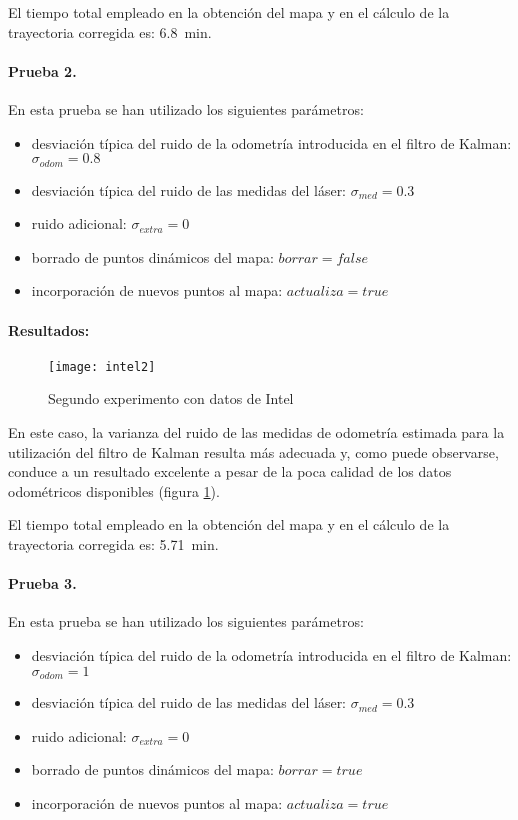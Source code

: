 El tiempo total empleado en la obtención del mapa y en el cálculo de la trayectoria corregida es: 6.8~min.

\paragraph{Prueba 2.}
En esta prueba se han utilizado los siguientes parámetros:
\begin{itemize}
  \item desviación típica del ruido de la odometría introducida en el filtro de Kalman: $\sigma_{odom} = 0.8$
  \item desviación típica del ruido de las medidas del láser: $\sigma_{med} = 0.3$
  \item ruido adicional: $\sigma_{extra} = 0$
  \item borrado de puntos dinámicos del mapa: $borrar = false$
  \item incorporación de nuevos puntos al mapa: $actualiza = true$
\end{itemize}

\paragraph{Resultados:}

\begin{figure}[h]
  \centering\texttt{[image: intel2]}\\
  \caption{Segundo experimento con datos de Intel}\label{fg:intel2}
\end{figure}

En este caso, la varianza del ruido de las medidas de odometría estimada para la utilización del filtro de Kalman resulta más adecuada y, como puede observarse, conduce a un resultado excelente a pesar de la poca calidad de los datos odométricos disponibles (figura \ref{fg:intel2}).

El tiempo total empleado en la obtención del mapa y en el cálculo de la trayectoria corregida es: 5.71~min.

\pagebreak[4]
\paragraph{Prueba 3.}
En esta prueba se han utilizado los siguientes parámetros:\nopagebreak[4]
\begin{itemize}
  \item desviación típica del ruido de la odometría introducida en el filtro de Kalman: $\sigma_{odom} = 1$
  \item desviación típica del ruido de las medidas del láser: $\sigma_{med} = 0.3$
  \item ruido adicional: $\sigma_{extra} = 0$
  \item borrado de puntos dinámicos del mapa: $borrar = true$
  \item incorporación de nuevos puntos al mapa: $actualiza = true$
\end{itemize}


